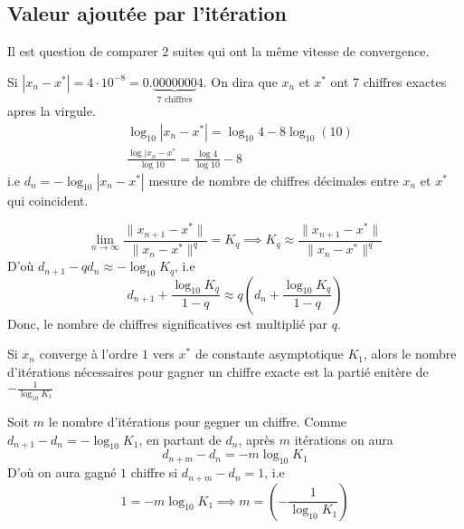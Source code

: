 \subsection{Valeur ajoutée par l'itération}
Il est question de comparer $2$ suites qui ont la même vitesse de convergence.
\begin{remark}
    Si $|x_n - x^*| = 4 \cdot 10^{-8} = 0.\underbrace{0000000}_{7 \text{ chiffres}}4$. On dira que $x_n$ et  $x^*$ ont 7 chiffres exactes apres la virgule.
    \begin{align*}
    &\log_{10} |x_n - x^*| = \log_{10}4 - 8\log_{10}(10)\\
    &\frac{\log|x_n - x^*}{\log 10} = \frac{\log 4}{\log 10} - 8
    \end{align*}
    i.e $d_n = - \log_{10} |x_n - x^*|$ mesure de nombre de chiffres décimales entre $x_n$ et  $x^*$ qui coincident.
\end{remark}
\begin{remark}
   \[
       \lim_{n \to \infty} \frac{\|x_{n+1} - x^*\|}{\|x_n - x^*\|^q} = K_q \implies K_q \approx \frac{\|x_{n+1} - x^*\|}{\|x_n - x^*\|^q}
   \]  
   D'où $d_{n+1} - q d_n \approx -\log_{10} K_q$, i.e
   \[
   d_{n+1} + \frac{\log_{10} K_q}{1 - q} \approx q(d_n + \frac{\log_{10} K_q}{1 - q})
   \] 
   Donc, le nombre de chiffres significatives est multiplié par $q$.
\end{remark}
\begin{prop}
   Si $x_n$ converge à l'ordre  $1$ vers  $x^*$ de constante asymptotique  $K_1$, alors le nombre d'itérations nécessaires pour gagner un chiffre exacte est la partié enitère de  $-\frac{1}{\log_{10}K_1}$ 
\end{prop}
\begin{preuve}
Soit $m$ le nombre d'itérations pour gegner un chiffre. Comme  $d_{n+1} - d_n = -\log_{10} K_1$, en partant de $d_n$, après  $m$ itérations on aura
 \[
     d_{n+m} - d_{n} = -m \log_{10}K_1
\] 
D'où on aura gagné $1$ chiffre si  $d_{n+m} - d_n = 1$, i.e
\[
1 = -m \log_{10}K_1 \implies m = \left( -\frac{1}{\log_{10}K_1} \right) 
\] 
\end{preuve}

